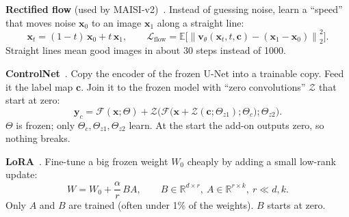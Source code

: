 \documentclass[11pt,a4paper,oneside]{report}
\newcommand{\x}{\bm{x}}
\newcommand{\E}{\mathbb{E}}
\newcommand{\Loss}{\mathcal{L}}
\newcommand{\R}{\mathbb{R}}
\newcommand{\norm}[1]{\left\lVert #1 \right\rVert}
\begin{document}
\textbf{Rectified flow} (used by MAISI-v2)~\cite{liu2023rf}. Instead of guessing noise, learn a ``speed'' that moves noise $\x_0$ to an image $\x_1$ along a straight line:
\begin{equation}\label{eq:maisi-rf}
\x_t=(1-t)\,\x_0+t\,\x_1,\qquad
\Loss_{\text{flow}}=\E\Big[\norm{\bm v_\theta(\x_t,t,\bm c)-(\x_1-\x_0)}_2^2\Big].
\end{equation}
Straight lines mean good images in about 30 steps instead of 1000.

\textbf{ControlNet}~\cite{zhang2023controlnet}. Copy the encoder of the frozen U-Net into a trainable copy. Feed it the label map $\bm c$. Join it to the frozen model with ``zero convolutions'' $\mathcal Z$ that start at zero:
\begin{equation}
\bm y_c = \mathcal F(\x;\Theta) + \mathcal Z\Big(\mathcal F\big(\x+\mathcal Z(\bm c;\Theta_{z1});\Theta_c\big);\Theta_{z2}\Big).
\end{equation}
$\Theta$ is frozen; only $\Theta_c,\Theta_{z1},\Theta_{z2}$ learn. At the start the add-on outputs zero, so nothing breaks.

\textbf{LoRA}~\cite{hu2022lora}. Fine-tune a big frozen weight $W_0$ cheaply by adding a small low-rank update:
\begin{equation}
W = W_0 + \frac{\alpha}{r}\,BA,\qquad B\in\R^{d\times r},\ A\in\R^{r\times k},\ r\ll d,k .
\end{equation}
Only $A$ and $B$ are trained (often under 1\% of the weights). $B$ starts at zero.
\end{document}
